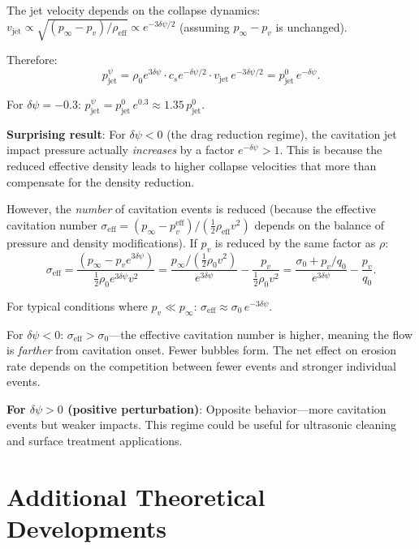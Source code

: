 \documentclass[12pt,twocolumn]{article}
\newcommand{\Reff}{\mathrm{eff}}
\newcommand{\dpsi}{\delta\psi}
\newcommand{\half}{\tfrac{1}{2}}
\begin{document}
The jet velocity depends on the collapse dynamics:
$v_\mathrm{jet} \propto \sqrt{(p_\infty - p_v)/\rho_\Reff}
\propto e^{-3\dpsi/2}$ (assuming $p_\infty - p_v$ is unchanged).

Therefore:
\begin{equation}
p_\mathrm{jet}^\psi = \rho_0 e^{3\dpsi}\cdot c_s e^{-\dpsi/2}
\cdot v_\mathrm{jet}\,e^{-3\dpsi/2}
= p_\mathrm{jet}^0\,e^{-\dpsi}.
\end{equation}

For $\dpsi = -0.3$: $p_\mathrm{jet}^\psi = p_\mathrm{jet}^0\,e^{0.3}
\approx 1.35\,p_\mathrm{jet}^0$.

\textbf{Surprising result}: For $\dpsi < 0$ (the drag reduction regime),
the cavitation jet impact pressure actually \emph{increases} by a factor
$e^{-\dpsi} > 1$. This is because the reduced effective density leads to
higher collapse velocities that more than compensate for the density
reduction.

However, the \emph{number} of cavitation events is reduced (because the
effective cavitation number $\sigma_\Reff = (p_\infty - p_v^\Reff)/
(\half\rho_\Reff v^2)$ depends on the balance of pressure and density
modifications). If $p_v$ is reduced by the same factor as $\rho$:
\begin{equation}
\sigma_\Reff = \frac{(p_\infty - p_v e^{3\dpsi})}
{\half\rho_0 e^{3\dpsi} v^2}
= \frac{p_\infty/(\half\rho_0 v^2)}{e^{3\dpsi}}
- \frac{p_v}{\half\rho_0 v^2}
= \frac{\sigma_0 + p_v/q_0}{e^{3\dpsi}} - \frac{p_v}{q_0}.
\end{equation}

For typical conditions where $p_v \ll p_\infty$:
$\sigma_\Reff \approx \sigma_0\,e^{-3\dpsi}$.

For $\dpsi < 0$: $\sigma_\Reff > \sigma_0$---the effective cavitation
number is higher, meaning the flow is \emph{farther} from cavitation
onset. Fewer bubbles form. The net effect on erosion rate depends on
the competition between fewer events and stronger individual events.

\textbf{For $\dpsi > 0$ (positive perturbation)}: Opposite behavior---more
cavitation events but weaker impacts. This regime could be useful for
ultrasonic cleaning and surface treatment applications.

\section{Additional Theoretical Developments}
\label{sec:additional}
\end{document}
